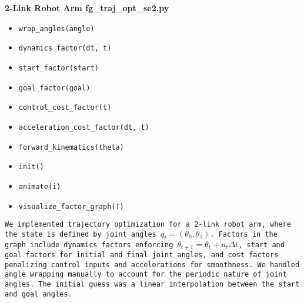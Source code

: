 \documentclass{article}
\begin{document}
\noindent\bfseries{2-Link Robot Arm}
\bfseries{\newline fg\_traj\_opt\_se2.py}
\begin{itemize}
    \item \texttt{wrap\_angles(angle)}
    \item \texttt{dynamics\_factor(dt, t)}
    \item \texttt{start\_factor(start)}
    \item \texttt{goal\_factor(goal)}
    \item \texttt{control\_cost\_factor(t)}
    \item \texttt{acceleration\_cost\_factor(dt, t)}
    \item \texttt{forward\_kinematics(theta)}
    \item \texttt{init()}
    \item \texttt{animate(i)}
    \item \texttt{visualize\_factor\_graph(T)}
\end{itemize}
\texttt{We implemented trajectory optimization for a 2-link robot arm, where the state is defined by joint angles \( q_t = (\theta_0, \theta_1) \). Factors in the graph include dynamics factors enforcing \( \theta_{t+1} = \theta_t + u_t \Delta t \), start and goal factors for initial and final joint angles, and cost factors penalizing control inputs and accelerations for smoothness. We handled angle wrapping manually to account for the periodic nature of joint angles. The initial guess was a linear interpolation between the start and goal angles.}

\end{document}
